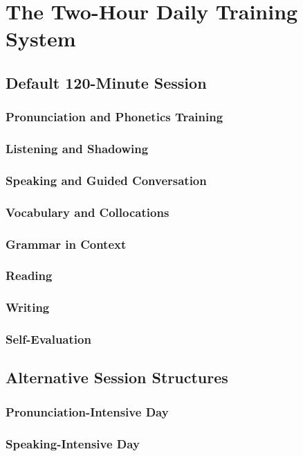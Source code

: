 \chapter{The Two-Hour Daily Training System}

\section{Default 120-Minute Session}
\subsection{Pronunciation and Phonetics Training}
\subsection{Listening and Shadowing}
\subsection{Speaking and Guided Conversation}
\subsection{Vocabulary and Collocations}
\subsection{Grammar in Context}
\subsection{Reading}
\subsection{Writing}
\subsection{Self-Evaluation}

\section{Alternative Session Structures}
\subsection{Pronunciation-Intensive Day}
\subsection{Speaking-Intensive Day}
